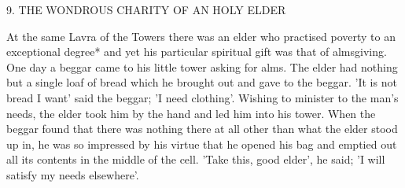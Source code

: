 9. THE WONDROUS CHARITY OF AN HOLY ELDER

At the same Lavra of the Towers there was an elder who practised
poverty to an exceptional degree* and yet his particular spiritual gift
was that of almsgiving. One day a beggar came to his little tower
asking for alms. The elder had nothing but a single loaf of bread
which he brought out and gave to the beggar. 'It is not bread I
want' said the beggar; 'I need clothing'. Wishing to minister to the
man's needs, the elder took him by the hand and led him into his
tower. When the beggar found that there was nothing there at all
other than what the elder stood up in, he was so impressed by his
virtue that he opened his bag and emptied out all its contents in the
middle of the cell. 'Take this, good elder', he said; 'I will satisfy my
needs elsewhere'.

